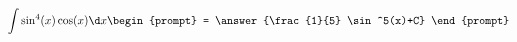 \documentclass{ximera}
\author{Steven Gubkin}
\begin{document}
\begin{exercise}


\[
\int \sin^4(x)\cos(x) \d x \begin{prompt} = \answer{\frac{1}{5} \sin^5(x)+C} \end{prompt}
\]

\end{exercise}
\end{document}
